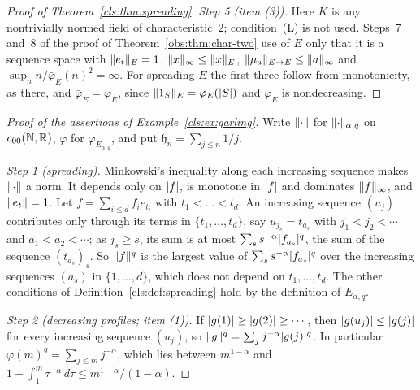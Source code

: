 \begin{proof}[Proof of Theorem~\ref{cls:thm:spreading}]
\emph{Step 5 (item (3)).} Here $K$ is any nontrivially normed field of characteristic~$2$; condition~\textup{(L)} is not
used. Steps~7 and~8 of the proof of Theorem~\ref{obs:thm:char-two} use of $E$ only that it is a sequence
space with $\lVert e_t\rVert_E=1$, $\lVert x\rVert_\infty\le\lVert x\rVert_E$, $\lVert \mu_a\rVert_{E\to E}\le\lVert a\rVert_\infty$ and
$\sup_nn/\bar\varphi_E(n)^2=\infty$. For spreading $E$ the first three follow from monotonicity, as there, and
$\bar\varphi_E=\varphi_E$, since $\lVert 1_S\rVert_E=\varphi_E(\lvert S\rvert)$ and $\varphi_E$ is nondecreasing.
\end{proof}

\begin{proof}[Proof of the assertions of Example~\ref{cls:ex:garling}]
Write $\lVert \cdot\rVert$ for $\lVert \cdot\rVert_{\alpha,q}$ on $c_{00}(\mathbb N,\mathbb R)$, $\varphi$ for $\varphi_{E_{\alpha,q}}$, and put
$\mathfrak h_n=\sum_{j\le n}1/j$.

\emph{Step 1 (spreading).} Minkowski's inequality along each increasing sequence makes $\lVert \cdot\rVert$ a norm. It depends
only on $\lvert f\rvert$, is monotone in $\lvert f\rvert$ and dominates $\lVert f\rVert_\infty$, and $\lVert e_t\rVert=1$. Let
$f=\sum_{i\le d}f_ie_{t_i}$ with $t_1<\dots<t_d$. An increasing sequence $(u_j)$ contributes only through its terms in
$\{t_1,\dots,t_d\}$, say $u_{j_s}=t_{a_s}$ with $j_1<j_2<\cdots$ and $a_1<a_2<\cdots$; as $j_s\ge s$, its sum is at most
$\sum_ss^{-\alpha}\lvert f_{a_s}\rvert^q$, the sum of the sequence $(t_{a_s})_s$. So $\lVert f\rVert^q$ is the largest value of
$\sum_ss^{-\alpha}\lvert f_{a_s}\rvert^q$ over the increasing sequences $(a_s)$ in $\{1,\dots,d\}$, which does not depend on
$t_1,\dots,t_d$. The other conditions of Definition~\ref{cls:def:spreading} hold by the definition of $E_{\alpha,q}$.

\emph{Step 2 (decreasing profiles; item (1)).} If $\lvert g(1)\rvert\ge\lvert g(2)\rvert\ge\cdots$, then $\lvert g(u_j)\rvert\le\lvert g(j)\rvert$
for every increasing sequence $(u_j)$, so $\lVert g\rVert^q=\sum_jj^{-\alpha}\lvert g(j)\rvert^q$. In particular
$\varphi(m)^q=\sum_{j\le m}j^{-\alpha}$, which lies between $m^{1-\alpha}$ and
$1+\int_1^m\tau^{-\alpha}\,d\tau\le m^{1-\alpha}/(1-\alpha)$.


\end{proof}

